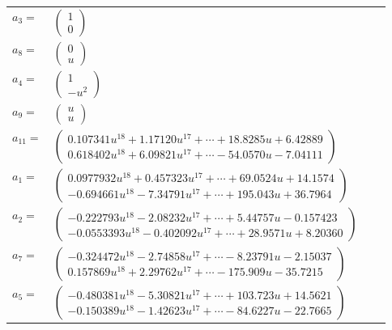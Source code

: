 \documentclass[1p]{elsarticle_modified}
\theoremstyle{definition}
\begin{document}
\begin{tabular}{m{7pt} m{180pt} m{7pt} m{180pt} }
\flushright $a_{3}=$&$\begin{pmatrix}1\\0\end{pmatrix}$ \\
\flushright $a_{8}=$&$\begin{pmatrix}0\\u\end{pmatrix}$ \\
\flushright $a_{4}=$&$\begin{pmatrix}1\\- u^2\end{pmatrix}$ \\
\flushright $a_{9}=$&$\begin{pmatrix}u\\u\end{pmatrix}$ \\
\flushright $a_{11}=$&$\begin{pmatrix}0.107341 u^{18}+1.17120 u^{17}+\cdots+18.8285 u+6.42889\\0.618402 u^{18}+6.09821 u^{17}+\cdots-54.0570 u-7.04111\end{pmatrix}$ \\
\flushright $a_{1}=$&$\begin{pmatrix}0.0977932 u^{18}+0.457323 u^{17}+\cdots+69.0524 u+14.1574\\-0.694661 u^{18}-7.34791 u^{17}+\cdots+195.043 u+36.7964\end{pmatrix}$ \\
\flushright $a_{2}=$&$\begin{pmatrix}-0.222793 u^{18}-2.08232 u^{17}+\cdots+5.44757 u-0.157423\\-0.0553393 u^{18}-0.402092 u^{17}+\cdots+28.9571 u+8.20360\end{pmatrix}$ \\
\flushright $a_{7}=$&$\begin{pmatrix}-0.324472 u^{18}-2.74858 u^{17}+\cdots-8.23791 u-2.15037\\0.157869 u^{18}+2.29762 u^{17}+\cdots-175.909 u-35.7215\end{pmatrix}$ \\
\flushright $a_{5}=$&$\begin{pmatrix}-0.480381 u^{18}-5.30821 u^{17}+\cdots+103.723 u+14.5621\\-0.150389 u^{18}-1.42623 u^{17}+\cdots-84.6227 u-22.7665\end{pmatrix}$ \\

\end{tabular}
\end{document}
